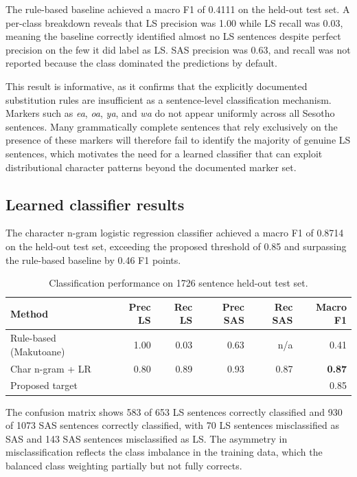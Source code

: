 \documentclass[12pt]{ThesisRU}
\begin{document}
The rule-based baseline achieved a macro F1 of 0.4111 on the held-out test set. A per-class breakdown reveals that LS precision was 1.00 while LS recall was 0.03, meaning the baseline correctly identified almost no LS sentences despite perfect precision on the few it did label as LS. SAS precision was 0.63, and recall was not reported because the class dominated the predictions by default.

This result is informative, as it confirms that the explicitly documented substitution rules are insufficient as a sentence-level classification mechanism. Markers such as \textit{ea}, \textit{oa}, \textit{ya}, and \textit{wa} do not appear uniformly across all Sesotho sentences. Many grammatically complete sentences that rely exclusively on the presence of these markers will therefore fail to identify the majority of genuine LS sentences, which motivates the need for a learned classifier that can exploit distributional character patterns beyond the documented marker set.

\subsection{Learned classifier results}
The character n-gram logistic regression classifier achieved a macro F1 of 0.8714 on the held-out test set, exceeding the proposed threshold of 0.85 and surpassing the rule-based baseline by 0.46 F1 points.

\begin{table}[ht]
    \centering
    \begin{tabular}{lrrrrr}
     \toprule
    \textbf{Method} & \textbf{Prec LS} & \textbf{Rec LS}
                    & \textbf{Prec SAS} & \textbf{Rec SAS}
                    & \textbf{Macro F1} \\
    \midrule
    Rule-based (Makutoane) & 1.00 & 0.03 & 0.63 & n/a & 0.41 \\
    Char n-gram + LR       & 0.80 & 0.89 & 0.93 & 0.87 &
                             \textbf{0.87} \\
    \midrule
    Proposed target        &      &      &      &      & 0.85 \\
    \bottomrule     
    \end{tabular}
    \caption{Classification performance on 1726 sentence held-out test set.}
    \label{tab:clf_compare}
\end{table}

The confusion matrix shows 583 of 653 LS sentences correctly classified and 930 of 1073 SAS sentences correctly classified, with 70 LS sentences misclassified as SAS and 143 SAS sentences misclassified as LS. The asymmetry in misclassification reflects the class imbalance in the training data, which the balanced class weighting partially but not fully corrects.
\end{document}
